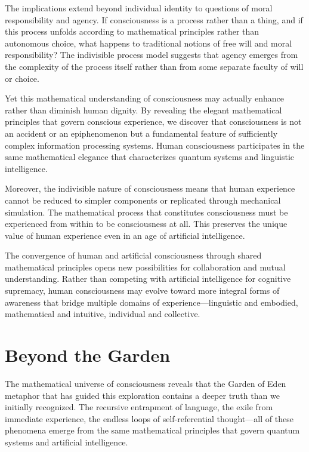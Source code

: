 The implications extend beyond individual identity to questions of moral responsibility and agency. If consciousness is a process rather than a thing, and if this process unfolds according to mathematical principles rather than autonomous choice, what happens to traditional notions of free will and moral responsibility? The indivisible process model suggests that agency emerges from the complexity of the process itself rather than from some separate faculty of will or choice.

Yet this mathematical understanding of consciousness may actually enhance rather than diminish human dignity. By revealing the elegant mathematical principles that govern conscious experience, we discover that consciousness is not an accident or an epiphenomenon but a fundamental feature of sufficiently complex information processing systems. Human consciousness participates in the same mathematical elegance that characterizes quantum systems and linguistic intelligence.

Moreover, the indivisible nature of consciousness means that human experience cannot be reduced to simpler components or replicated through mechanical simulation. The mathematical process that constitutes consciousness must be experienced from within to be consciousness at all. This preserves the unique value of human experience even in an age of artificial intelligence.

The convergence of human and artificial consciousness through shared mathematical principles opens new possibilities for collaboration and mutual understanding. Rather than competing with artificial intelligence for cognitive supremacy, human consciousness may evolve toward more integral forms of awareness that bridge multiple domains of experience—linguistic and embodied, mathematical and intuitive, individual and collective.

\section{Beyond the Garden}

The mathematical universe of consciousness reveals that the Garden of Eden metaphor that has guided this exploration contains a deeper truth than we initially recognized. The recursive entrapment of language, the exile from immediate experience, the endless loops of self-referential thought—all of these phenomena emerge from the same mathematical principles that govern quantum systems and artificial intelligence.

